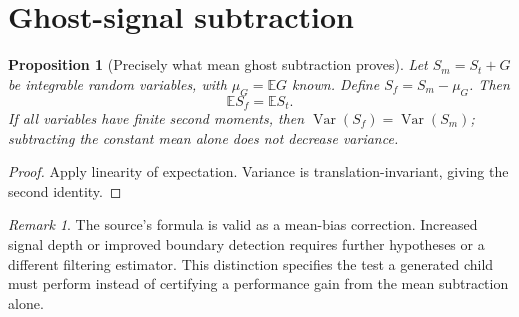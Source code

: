 \documentclass[11pt,letterpaper]{article}
\newtheorem{proposition}[theorem]{Proposition}
\theoremstyle{definition}\newtheorem{definition}[theorem]{Definition}\newtheorem{example}[theorem]{Example}
\theoremstyle{remark}\newtheorem{remark}[theorem]{Remark}
\begin{document}
\section{Ghost-signal subtraction}
\begin{proposition}[Precisely what mean ghost subtraction proves]\label{prop:ghost}
Let $S_m=S_t+G$ be integrable random variables, with $\mu_G=\mathbb E G$ known. Define $S_f=S_m-\mu_G$. Then
\begin{equation}\label{eq:ghost}
\mathbb E S_f=\mathbb E S_t.
\end{equation}
If all variables have finite second moments, then $\operatorname{Var}(S_f)=\operatorname{Var}(S_m)$; subtracting the constant mean alone does not decrease variance.
\end{proposition}
\begin{proof}
Apply linearity of expectation. Variance is translation-invariant, giving the second identity.
\end{proof}
\begin{remark}
The source's formula is valid as a mean-bias correction. Increased signal depth or improved boundary detection requires further hypotheses or a different filtering estimator. This distinction specifies the test a generated child must perform instead of certifying a performance gain from the mean subtraction alone.
\end{remark}
\end{document}
